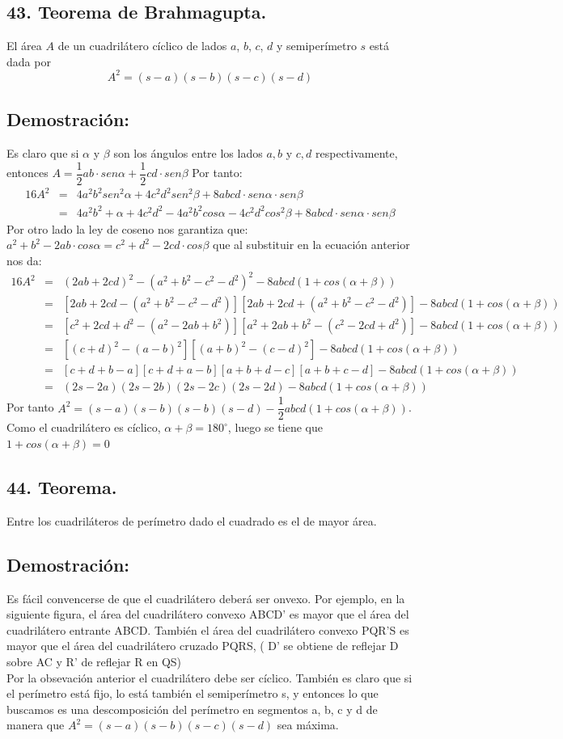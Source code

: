\documentclass[12pt,a4paper]{article}
\begin{document}
\subsection*{43. Teorema de Brahmagupta.}
El área $A$ de un cuadrilátero cíclico de lados $a$, $b$, $c$, $d$ y semiperímetro $s$ está dada por $$A^2=(s-a)(s-b)(s-c)(s-d)$$
\subsection*{Demostración:}
Es claro que si $\alpha$ y $\beta$ son los ángulos entre los lados $ a, b$ y $c, d$ respectivamente, entonces $A= \dfrac{1}{2}ab \cdot sen \alpha + \dfrac{1}{2}cd \cdot sen \beta$ Por tanto:
\begin{eqnarray*}
16 A^2&=& 4a^2b^2 sen^2 \alpha + 4c^2 d^2 sen ^2 \beta +8abcd \cdot sen \alpha \cdot sen \beta
\\&=& 4a^2b^2 + \alpha + 4c^2 d^2 -4a^2b^2cos \alpha - 4c^2 d^2 cos^2 \beta +8abcd\cdot sen \alpha \cdot sen \beta
\end{eqnarray*}
Por otro lado la ley de coseno nos garantiza que: 
$a^2+ b^2 - 2ab \cdot cos \alpha = c^2 + d^2 - 2cd \cdot cos \beta$
que al substituir  en la ecuación anterior nos da:
\begin{eqnarray*}
16 A^2&=& (2ab + 2cd)^2 -(a^2 + b^2 - c^2 -d^2)^2-8abcd (1+cos(\alpha + \beta))
\\&=& [2ab + 2cd- (a^2+ b^2 -c^2 -d^2)][2ab + 2cd + (a^2+ b^2- c^2 -d^2)]- 8abcd(1 + cos(\alpha + \beta))
\\&=&[c^2 +2cd +d^2 -(a^2-2ab+ b^2)][a^2+2ab+b^2-(c^2-2cd+d^2)]-8abcd(1+cos(\alpha + \beta))
\\&=&[(c+d)^2- (a-b)^2][(a+b)^2- (c-d)^2]-8abcd(1+ cos(\alpha + \beta))
\\&=&[c+d+b-a][c+d+a-b][a+b+d-c][a+b+c-d]-8abcd(1+cos(\alpha + \beta))
\\&=&(2s-2a)(2s-2b)(2s-2c)(2s-2d)-8abcd(1+cos(\alpha + \beta))
\end{eqnarray*}
Por tanto $A^2=(s-a)(s-b)(s-b)(s-d)-\dfrac{1}{2}abcd(1+cos(\alpha + \beta))$. Como el cuadrilátero es cíclico, $\alpha + \beta = 180^\circ$, luego se tiene que $1+cos(\alpha + \beta)=0$
\subsection*{44. Teorema.}
Entre los cuadriláteros de perímetro dado el cuadrado es el de mayor área.
\subsection*{Demostración:}
Es fácil convencerse de que el cuadrilátero deberá ser onvexo. Por ejemplo, en la siguiente figura, el área del cuadrilátero convexo ABCD' es mayor que el área del cuadrilátero entrante ABCD. También el área del cuadrilátero convexo PQR'S es mayor que el área del cuadrilátero cruzado PQRS, ( D' se obtiene  de reflejar D sobre AC y R' de reflejar R en QS)
\\Por la obsevación anterior el cuadrilátero debe ser cíclico. También  es claro que si el perímetro está fijo, lo está también el semiperímetro s, y entonces lo que buscamos es una descomposición del perímetro en segmentos a, b, c y d de manera que $A^2=(s-a)(s-b)(s-c)(s-d)$ sea máxima. 
\end{document}
